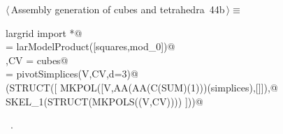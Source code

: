 \documentclass[11pt,oneside]{article}	%
\begin{document}
\begin{flushleft} \small \label{scrap96}
\protect{}$\langle\,$Assembly generation of cubes and tetrahedra\nobreak\ {\footnotesize 44b}$\,\rangle\equiv$
\vspace{-1ex}
\begin{list}{}{} \item
\mbox{}\verb@from largrid import *@\\
\mbox{}\verb@cubes = larModelProduct([squares,mod_0])@\\
\mbox{}\verb@V,CV = cubes@\\
\mbox{}\verb@simplices = pivotSimplices(V,CV,d=3)@\\
\mbox{}\verb@VIEW(STRUCT([ MKPOL([V,AA(AA(C(SUM)(1)))(simplices),[]]),@\\
\mbox{}\verb@           SKEL_1(STRUCT(MKPOLS((V,CV)))) ]))@\\
\mbox{}\verb@@{\NWsep}
\end{list}
\vspace{-1ex}
\footnotesize\addtolength{\baselineskip}{-1ex}
\begin{list}{}{\setlength{\itemsep}{-\parsep}\setlength{\itemindent}{-\leftmargin}}
\item \NWtxtMacroRefIn\ .
\end{list}
\end{flushleft}









\end{document}

